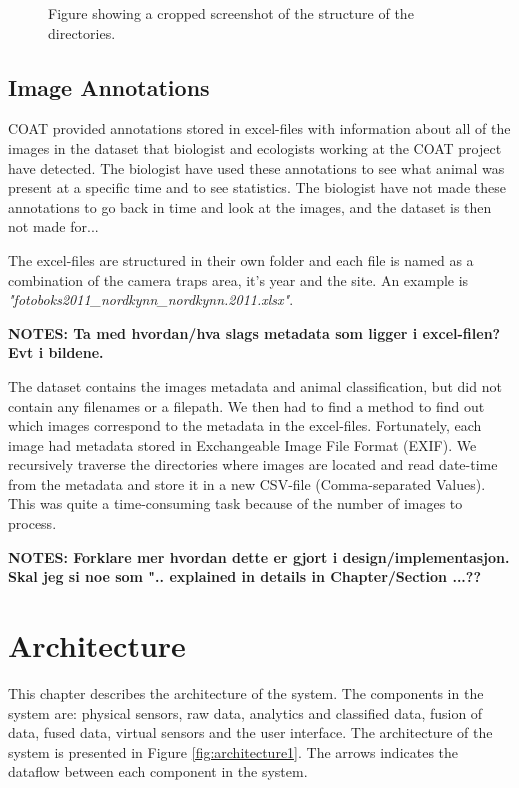 \documentclass[USenglish]{uit-thesis}
\begin{document}
\begin{figure}
\caption{Figure showing a cropped screenshot of the structure of the directories.}
\label{fig:directories}
\end{figure}

\section{Image Annotations}

COAT provided annotations stored in excel-files with information about all of the images in the dataset that biologist and ecologists working at the COAT project have detected. The biologist have used these annotations to see what animal was present at a specific time and to see statistics. The biologist have not made these annotations to go back in time and look at the images, and the dataset is then not made for...

 
The excel-files are structured in their own folder and each file is named as a combination of the camera traps area, it's year and the site. An example is \textit{"fotoboks2011\_nordkynn\_nordkynn.2011.xlsx"}.

\textbf{NOTES: Ta med hvordan/hva slags metadata som ligger i excel-filen? Evt i bildene.}

The dataset contains the images metadata and animal classification, but did not contain any filenames or a filepath. We then had to find a method to find out which images correspond to the metadata in the excel-files. Fortunately, each image had metadata stored in Exchangeable Image File Format (EXIF). We recursively traverse the directories where images are located and read date-time from the metadata and store it in a new CSV-file (Comma-separated Values).
This was quite a time-consuming task because of the number of images to process.

\textbf{NOTES: Forklare mer hvordan dette er gjort i design/implementasjon. Skal jeg si noe som ".. explained in details in Chapter/Section ...??}



\chapter{Architecture}
This chapter describes the architecture of the system.
The components in the system are: physical sensors, raw data, analytics and classified data, fusion of data, fused data, virtual sensors and the user interface. 
The architecture of the system is presented in Figure \ref{fig:architecture1}. The arrows indicates the dataflow between each component in the system.
\end{document}

